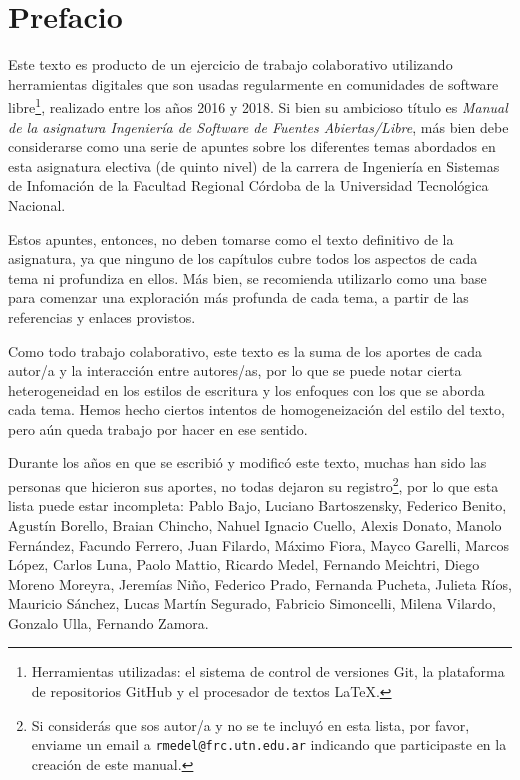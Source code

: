 \chapter*{Prefacio}

Este texto es producto de un ejercicio de trabajo colaborativo utilizando herramientas digitales que son usadas regularmente en comunidades de software libre\footnote{Herramientas utilizadas: el sistema de control de versiones Git, la plataforma de repositorios GitHub y el procesador de textos \LaTeX.}, realizado entre los años 2016 y 2018. Si bien su ambicioso título es \emph{Manual de la asignatura Ingeniería de Software de Fuentes Abiertas/Libre}, más bien debe considerarse como una serie de apuntes sobre los diferentes temas abordados en esta asignatura electiva (de quinto nivel) de la carrera de Ingeniería en Sistemas de Infomación de la Facultad Regional Córdoba de la Universidad Tecnológica Nacional.

Estos apuntes, entonces, no deben tomarse como el texto definitivo de la asignatura, ya que ninguno de los capítulos cubre todos los aspectos de cada tema ni profundiza en ellos. Más bien, se recomienda utilizarlo como una base para comenzar una exploración más profunda de cada tema, a partir de las referencias y enlaces provistos.

Como todo trabajo colaborativo, este texto es la suma de los aportes de cada autor/a y la interacción entre autores/as, por lo que se puede notar cierta heterogeneidad en los estilos de escritura y los enfoques con los que se aborda cada tema. Hemos hecho ciertos intentos de homogeneización del estilo del texto, pero aún queda trabajo por hacer en ese sentido.

Durante los años en que se escribió y modificó este texto, muchas han sido las personas que hicieron sus aportes, no todas dejaron su registro\footnote{Si considerás que sos autor/a y no se te incluyó en esta lista, por favor, enviame un email a \texttt{rmedel@frc.utn.edu.ar} indicando que participaste en la creación de este manual.}, por lo que esta lista puede estar incompleta: 
Pablo Bajo,
Luciano Bartoszensky,
Federico Benito,
Agustín Borello,
Braian Chincho,
Nahuel Ignacio Cuello,
Alexis Donato,
Manolo Fernández, 
Facundo Ferrero,
Juan Filardo,
Máximo Fiora, 
Mayco Garelli,   
Marcos López,
Carlos Luna,
Paolo Mattio,
Ricardo Medel,
Fernando Meichtri,
Diego Moreno Moreyra, 
Jeremías Niño,
Federico Prado,
Fernanda Pucheta, 
Julieta Ríos,
Mauricio Sánchez,
Lucas Martín Segurado,
Fabricio Simoncelli,
Milena Vilardo,
Gonzalo Ulla,
Fernando Zamora.

